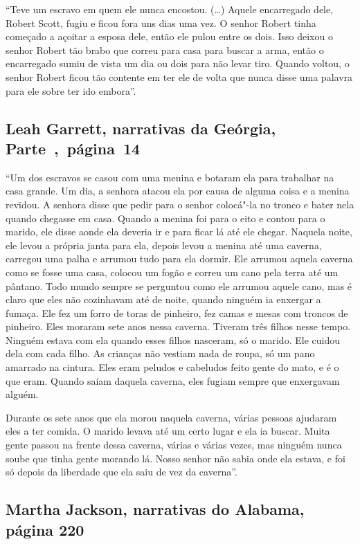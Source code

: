 ``Teve um escravo em quem ele nunca encostou. (\ldots{}) Aquele
encarregado dele, Robert Scott, fugiu e ficou fora uns dias uma vez. O
senhor Robert tinha começado a açoitar a esposa dele, então ele pulou
entre os dois. Isso deixou o senhor Robert tão brabo que correu para
casa para buscar a arma, então o encarregado sumiu de vista um dia ou
dois para não levar tiro. Quando voltou, o senhor Robert ficou tão
contente em ter ele de volta que nunca disse uma palavra para ele sobre
ter ido embora''.

\subsection{Leah Garrett, narrativas da Geórgia, Parte~,~página~14} \label{ref102}

``Um dos escravos se casou com uma menina e botaram ela para trabalhar
na casa grande. Um dia, a senhora atacou ela por causa de alguma coisa e
a menina revidou. A senhora disse que pedir para o senhor colocá"-la no %
tronco e bater nela quando chegasse em casa. Quando a menina foi para o
eito e contou para o marido, ele disse aonde ela deveria ir e para ficar
lá até ele chegar. Naquela noite, ele levou a própria janta para ela,
depois levou a menina até uma caverna, carregou uma palha e arrumou tudo
para ela dormir. Ele arrumou aquela caverna como se fosse uma casa,
colocou um fogão e correu um cano pela terra até um pântano. Todo mundo
sempre se perguntou como ele arrumou aquele cano, mas é claro que eles
não cozinhavam até de noite, quando ninguém ia enxergar a fumaça. Ele
fez um forro de toras de pinheiro, fez camas e mesas com troncos de
pinheiro. Eles moraram sete anos nessa caverna. Tiveram três filhos
nesse tempo. Ninguém estava com ela quando esses filhos nasceram, só o
marido. Ele cuidou dela com cada filho. As crianças não vestiam nada de
roupa, só um pano amarrado na cintura. Eles eram peludos e cabeludos
feito gente do mato, e é o que eram. Quando saíam daquela caverna, eles
fugiam sempre que enxergavam alguém.

Durante os sete anos que ela morou naquela caverna, várias pessoas
ajudaram eles a ter comida. O marido levava até um certo lugar e ela ia
buscar. Muita gente passou na frente dessa caverna, várias e várias
vezes, mas ninguém nunca soube que tinha gente morando lá. Nosso senhor
não sabia onde ela estava, e foi só depois da liberdade que ela saiu de
vez da caverna''.

\subsection{Martha Jackson, narrativas do Alabama, página 220}
\label{ref160}

